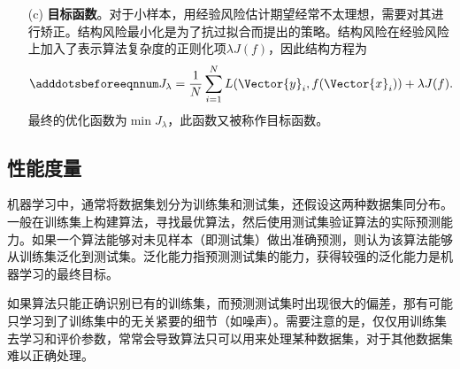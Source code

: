 \begin{itemize}
  \item[(c)] \textbf{目标函数}。对于小样本，用经验风险估计期望经常不太理想，需要对其进行矫正。结构风险最小化是为了抗过拟合而提出的策略。结构风险在经验风险上加入了表示算法复杂度的正则化项$\lambda J(f)$，因此结构方程为
  \begin{equation}\adddotsbeforeeqnnum
    \label{eq:ml_loss_structure}
    J_{\lambda}=\frac{1}{N}\sum_{i=1}^{N}L(\Vector{y}_i,f(\Vector{x}_i))+\lambda J(f).
  \end{equation}
  最终的优化函数为$\min J_{\lambda}$，此函数又被称作目标函数。
\end{itemize}

\subsection{性能度量}\label{sec:ml_performance}

机器学习中，通常将数据集划分为训练集和测试集，还假设这两种数据集同分布。一般在训练集上构建算法，寻找最优算法，然后使用测试集验证算法的实际预测能力。如果一个算法能够对未见样本（即测试集）做出准确预测，则认为该算法能够从训练集泛化到测试集。泛化能力指预测测试集的能力，获得较强的泛化能力是机器学习的最终目标。

如果算法只能正确识别已有的训练集，而预测测试集时出现很大的偏差，那有可能只学习到了训练集中的无关紧要的细节（如噪声）。需要注意的是，仅仅用训练集去学习和评价参数，常常会导致算法只可以用来处理某种数据集，对于其他数据集难以正确处理。

